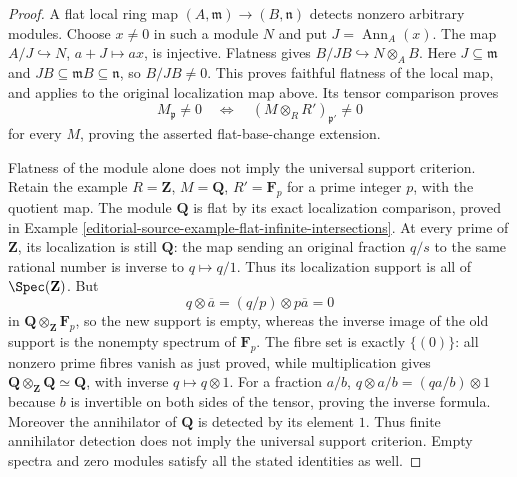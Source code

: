 \begin{proof}
A flat local ring map $(A,\mathfrak m)\to(B,\mathfrak n)$
detects nonzero arbitrary modules. Choose $x\ne0$ in such
a module $N$ and put $J=\operatorname{Ann}_A(x)$.
The map $A/J\hookrightarrow N$, $a+J\mapsto ax$, is
injective. Flatness gives $B/JB\hookrightarrow N\otimes_AB$.
Here $J\subseteq\mathfrak m$ and
$JB\subseteq\mathfrak mB\subseteq\mathfrak n$, so
$B/JB\ne0$. This proves faithful flatness of the local
map, and applies to the original localization map above.
Its tensor comparison proves
$$
M_{\mathfrak p}\ne0
\quad\Longleftrightarrow\quad
(M\otimes_RR')_{\mathfrak p'}\ne0
$$
for every $M$, proving the asserted flat-base-change extension.

Flatness of the module alone does not imply the universal
support criterion. Retain the example
$R=\mathbf Z$, $M=\mathbf Q$, $R'=\mathbf F_p$ for a
prime integer $p$, with the quotient map. The module
$\mathbf Q$ is flat by its exact localization comparison,
proved in Example \ref{editorial-source-example-flat-infinite-intersections}.
At every prime of $\mathbf Z$, its localization is still
$\mathbf Q$: the map sending an original fraction $q/s$
to the same rational number is inverse to $q\mapsto q/1$.
Thus its localization support is all of $\Spec(\mathbf Z)$.
But
$$
q\otimes\overline a=(q/p)\otimes p\overline a=0
$$
in $\mathbf Q\otimes_{\mathbf Z}\mathbf F_p$, so the
new support is empty, whereas the inverse image of the
old support is the nonempty spectrum of $\mathbf F_p$.
The fibre set is exactly $\{(0)\}$: all nonzero prime
fibres vanish as just proved, while multiplication gives
$\mathbf Q\otimes_{\mathbf Z}\mathbf Q\simeq\mathbf Q$,
with inverse $q\mapsto q\otimes1$. For a fraction $a/b$,
$q\otimes a/b=(qa/b)\otimes1$ because $b$ is invertible
on both sides of the tensor, proving the inverse formula.
Moreover the annihilator of $\mathbf Q$ is detected by
its element $1$. Thus finite annihilator detection does
not imply the universal support criterion. Empty spectra
and zero modules satisfy all the stated identities as well.
\end{proof}